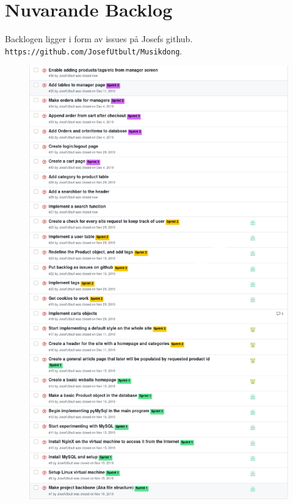 \documentclass[a4paper]{article}
\begin{document}
\section{Nuvarande Backlog}
Backlogen ligger i form av issues på Josefs github. \texttt{https://github.com/JosefUtbult/Musikdong}.
%
\begin{figure}[H]
\includegraphics[width=\textwidth,height=\textheight,keepaspectratio]{Backlog.png}
\centering
\end{figure}
%
\end{document}
